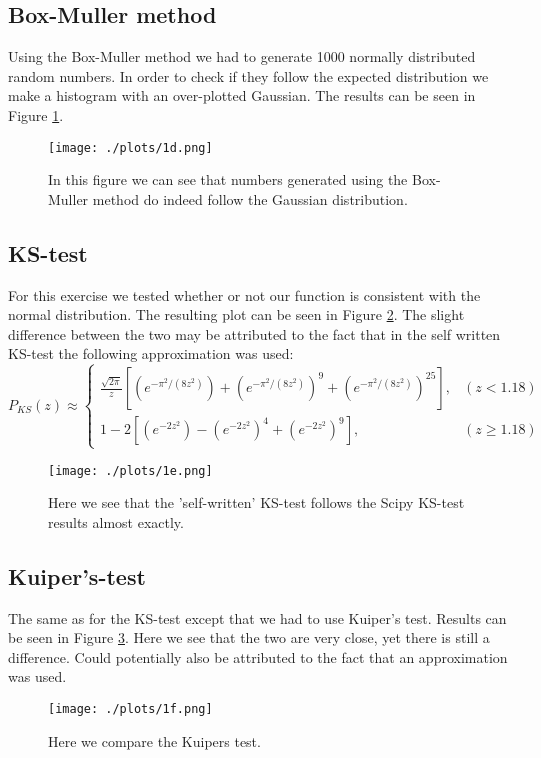 \documentclass[a4paper,10pt]{article}
\begin{document}
\subsection{Box-Muller method}
Using the Box-Muller method we had to generate 1000 normally distributed random numbers. In order to check if they follow the expected distribution we make a histogram with an over-plotted Gaussian. The results can be seen in Figure \ref{fig:1d}.

\begin{figure}[h!]
  \centering
  \texttt{[image: ./plots/1d.png]}
  \caption{In this figure we can see that numbers generated using the Box-Muller method do indeed follow the Gaussian distribution.}
  \label{fig:1d}
\end{figure}

\subsection{KS-test}
For this exercise we tested whether or not our function is consistent with the normal distribution. The resulting plot can be seen in Figure \ref{fig:1e}. The slight difference between the two may be attributed to the fact that in the self written KS-test the following approximation was used: 
\[
	P_{KS}(z)\approx
\begin{cases}
	\frac{\sqrt{2\pi}}{z}[(e^{-\pi^2/(8z^2)})+(e^{-\pi^2/(8z^2)})^9+(e^{-\pi^2/(8z^2)})^25],& (z<1.18)\\
	1-2[(e^{-2z^2})-(e^{-2z^2})^4+(e^{-2z^2})^9],	& (z\geq 1.18)
\end{cases}
\]


\begin{figure}[h!]
  \centering
  \texttt{[image: ./plots/1e.png]}
  \caption{Here we see that the 'self-written' KS-test follows the Scipy KS-test results almost exactly.}
  \label{fig:1e}
\end{figure}

\subsection{Kuiper's-test}

The same as for the KS-test except that we had to use Kuiper's test. Results can be seen in Figure \ref{fig:1f}. Here we see that the two are very close, yet there is still a difference. Could potentially also be attributed to the fact that an approximation was used. 

\begin{figure}[h!]
  \centering
  \texttt{[image: ./plots/1f.png]}
  \caption{Here we compare the Kuipers test.}
  \label{fig:1f}
\end{figure}
\end{document}
